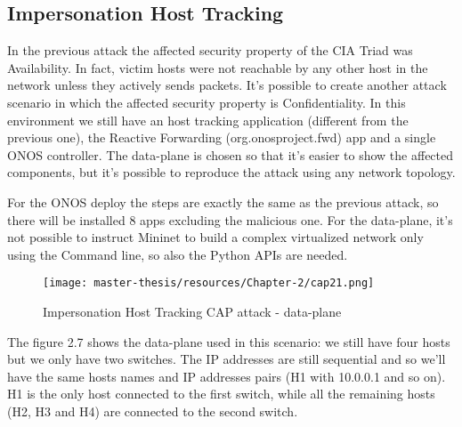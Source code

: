 \documentclass[a4paper,10pt]{memoir}
\begin{document}
\subsection{Impersonation Host Tracking}
In the previous attack the affected security property of the CIA Triad was Availability. In fact, victim hosts were not reachable by any other host in the network unless they actively sends packets. It's possible to create another attack scenario in which the affected security property is Confidentiality. In this environment we still have an host tracking application (different from the previous one), the Reactive Forwarding (org.onosproject.fwd) app and a single ONOS controller. The data-plane is chosen so that it's easier to show the affected components, but it's possible to reproduce the attack using any network topology.

For the ONOS deploy the steps are exactly the same as the previous attack, so there will be installed 8 apps excluding the malicious one. For the data-plane, it's not possible to instruct Mininet to build a complex virtualized network only using the Command line, so also the Python APIs are needed.
\begin{figure}[h]
\caption{Impersonation Host Tracking CAP attack - data-plane}
\label{fig:cap2-dataplane}
\texttt{[image: master-thesis/resources/Chapter-2/cap21.png]}
\centering
\end{figure}
The figure 2.7 shows the data-plane used in this scenario: we still have four hosts but we only have two switches. The IP addresses are still sequential and so we'll have the same hosts names and IP addresses pairs (H1 with 10.0.0.1 and so on). H1 is the only host connected to the first switch, while all the remaining hosts (H2, H3 and H4) are connected to the second switch.
\medskip
\end{document}
